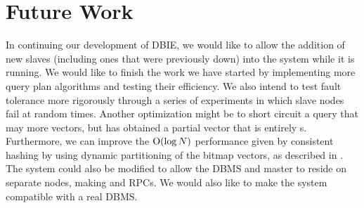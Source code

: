 \section{Future Work}
In continuing our development of DBIE, we would like to allow the addition of new slaves
(including ones that were previously down) into the system while it is running.
We would like to finish the work we have started by implementing more
query plan algorithms and testing their efficiency. We also intend to test
fault tolerance more rigorously through a series of experiments in which
slave nodes fail at random times. Another optimization might be to short
circuit a query that may  more vectors, but has obtained a partial
vector that is entirely s. Furthermore, we can improve the
\(\mathrm{O}(\log{N})\) performance given by consistent hashing by using dynamic
partitioning of the bitmap vectors, as described in \cite{kleppmann2017}.
The system could also be modified to allow the DBMS and master to reside on separate nodes, making
 and  RPCs. We would also like to make the system
compatible with a real DBMS.
